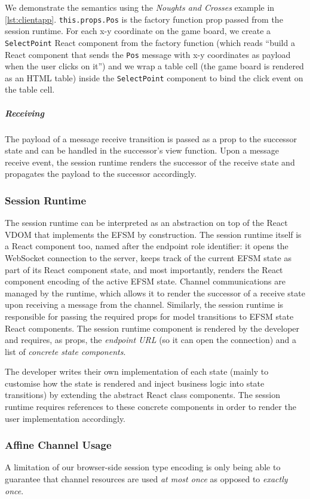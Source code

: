 We demonstrate the semantics using the \textit{Noughts and Crosses} example in
\cref{lst:clientapp}.
\texttt{this.props.Pos} is the factory function prop
passed from the session runtime.
For each x-y coordinate on the game board, we
create a \texttt{SelectPoint} React component from the factory function (which
reads ``build a React component that sends the \texttt{Pos} message with x-y
coordinates as payload when the user clicks on it'') and we wrap a table cell
(the game board is rendered as an HTML table) inside the \texttt{SelectPoint}
component to bind the click event on the table cell.

\subparagraph{Receiving}
The payload of a message receive transition is passed as
a prop to the successor state and can be handled in the successor's view
function.
Upon a message receive event, the session runtime renders the
successor of the receive state and propagates the payload to the successor
accordingly.

\subsubsection{Session Runtime}
\label{section:clientruntime}

The session runtime can be interpreted as an abstraction on top of the React
VDOM that implements the EFSM by construction.
The session runtime itself is a React component too, named after the endpoint
role identifier:
it opens the WebSocket connection to the server, keeps track of the current
EFSM state as part of its React component state, and most importantly, renders
the React component encoding of the active EFSM state.
Channel communications are managed by the runtime, which allows it to render
the successor of a receive state upon receiving a message from the channel.
Similarly, the session runtime is responsible for passing the required props
for model transitions to EFSM state React components.
The session runtime component is rendered by the developer and requires, as
props, the \textit{endpoint URL} (so it can open the connection) and a list of
\textit{concrete state components}.

The developer writes their own implementation of each state (mainly to
customise how the state is rendered and inject business logic into state
transitions) by extending the abstract React class components.
The session runtime requires references to these concrete components in order to
render the user implementation accordingly.

\subsubsection{Affine Channel Usage}
A limitation of our browser-side session type encoding is only being able to
guarantee that channel resources are used \textit{at most once} as opposed to
\textit{exactly once}.


